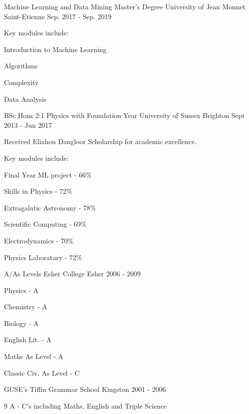 \begin{cventries}
	\cventry
	{Machine Learning and Data Mining Master's Degree}
	{University of Jean Monnet}
	{Saint-Etienne}
	{Sep. 2017 - Sep. 2019}
	{
		\begin{cvitems}
			\item{Key modules include:}
			\setlength\multicolsep{0pt}
			\begin{multicols}{2}
				\item{Introduction to Machine Learning}
				\item{Algorithms}
				\item{Complexity}
				\item{Data Analysis}
			\end{multicols}
		\end{cvitems}
	}
	\cventry
    {BSc Hons 2:1 Physics with Foundation Year}
    {University of Sussex}
    {Brighton}
    {Sept 2013 - Jun 2017}
    {
      \begin{cvitems}
      \item{Received Eliahou Dangloor Scholarship for academic excellence.}
      \item{Key modules include:}
      \setlength\multicolsep{0pt}
      \begin{multicols}{3}
        \item{Final Year ML project - 66\% }
        \item{Skills in Physics - 72\%}
        \item{Extragalatic Astronomy - 78\%}
        \item{Scientific Computing - 69\%}
        \item{Electrodynamics - 70\%}
        \item{Physics Laboratory - 72\%}
      \end{multicols}
      \end{cvitems}
    }
  \cventry
    {A/As Levels}
    {Esher College}
    {Esher}
    {2006 - 2009}
    { 
    \begin{cvitems}
    \setlength\multicolsep{0pt}
      \begin{multicols}{3}
      \item{Physics - A}
      \item{Chemistry - A}
      \item{Biology - A}
      \item{English Lit. - A}
      \item{Maths As Level - A}
      \item{Classic Civ. As Level - C}
      \end{multicols}
      \end{cvitems}
    }
  \cventry
    {GCSE's}
    {Tiffin Grammar School}
    {Kingston}
    {2001 - 2006}
    {
    \begin{cvitems}
      \item{9 A - C's including Maths, English and Triple Science}
      \end{cvitems}
    }
\end{cventries}
